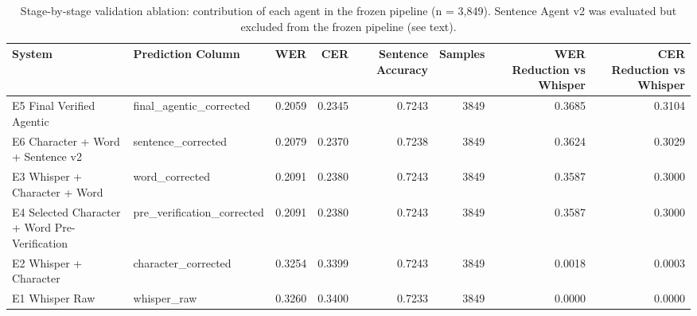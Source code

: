 \begin{table}
\caption{Stage-by-stage validation ablation: contribution of each agent in the frozen pipeline (n = 3,849). Sentence Agent v2 was evaluated but excluded from the frozen pipeline (see text).}
\label{tab:table_4_validation_ablation}
\begin{tabular}{llrrrrrr}
\toprule
System & Prediction Column & WER & CER & Sentence Accuracy & Samples & WER Reduction vs Whisper & CER Reduction vs Whisper \\
\midrule
E5 Final Verified Agentic & final_agentic_corrected & 0.2059 & 0.2345 & 0.7243 & 3849 & 0.3685 & 0.3104 \\
E6 Character + Word + Sentence v2 & sentence_corrected & 0.2079 & 0.2370 & 0.7238 & 3849 & 0.3624 & 0.3029 \\
E3 Whisper + Character + Word & word_corrected & 0.2091 & 0.2380 & 0.7243 & 3849 & 0.3587 & 0.3000 \\
E4 Selected Character + Word Pre-Verification & pre_verification_corrected & 0.2091 & 0.2380 & 0.7243 & 3849 & 0.3587 & 0.3000 \\
E2 Whisper + Character & character_corrected & 0.3254 & 0.3399 & 0.7243 & 3849 & 0.0018 & 0.0003 \\
E1 Whisper Raw & whisper_raw & 0.3260 & 0.3400 & 0.7233 & 3849 & 0.0000 & 0.0000 \\
\bottomrule
\end{tabular}
\end{table}
